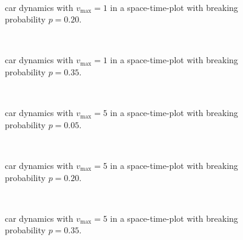\documentclass[aps,pra,showpacs,preprintnumbers,amsmath,amssymb,nofootinbib]{revtex4-2}
\begin{document}
    \begin{figure}[H]
        \subfloat[$\rho = 0.05$]{}
        \subfloat[$\rho = 0.15$]{} \\
        \subfloat[$\rho = 0.25$]{}
        \caption{car dynamics with $v_{\mathrm{max}} = 1$ in a space-time-plot with breaking probability $p = 0.20$.}
    \end{figure}
    
    \begin{figure}[H]
        \subfloat[$\rho = 0.05$]{}
        \subfloat[$\rho = 0.15$]{} \\
        \subfloat[$\rho = 0.25$]{}
        \caption{car dynamics with $v_{\mathrm{max}} = 1$ in a space-time-plot with breaking probability $p = 0.35$.}
    \end{figure}
    
    \begin{figure}[H]
        \subfloat[$\rho = 0.05$]{}
        \subfloat[$\rho = 0.15$]{} \\
        \subfloat[$\rho = 0.25$]{}
        \caption{car dynamics with $v_{\mathrm{max}} = 5$ in a space-time-plot with breaking probability $p = 0.05$.}
    \end{figure}
    
    \begin{figure}[H]
        \subfloat[$\rho = 0.05$]{}
        \subfloat[$\rho = 0.15$]{} \\
        \subfloat[$\rho = 0.25$]{}
        \caption{car dynamics with $v_{\mathrm{max}} = 5$ in a space-time-plot with breaking probability $p = 0.20$.}
    \end{figure}
    
    \begin{figure}[H]
        \subfloat[$\rho = 0.05$]{}
        \subfloat[$\rho = 0.15$]{} \\
        \subfloat[$\rho = 0.25$]{}
        \caption{car dynamics with $v_{\mathrm{max}} = 5$ in a space-time-plot with breaking probability $p = 0.35$.}
    \end{figure}
\end{document}

